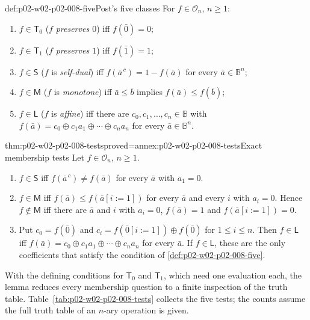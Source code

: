 \begin{hbdefinition}{def:p02-w02-p02-008-five}{Post's five classes}
For \(f\in\mathcal O_n\), \(n\geq1\):
\begin{enumerate}
\item \(f\in\mathsf T_0\) (\(f\) \emph{preserves \(0\)}) iff
  \(f(\bar0)=0\);
\item \(f\in\mathsf T_1\) (\(f\) \emph{preserves \(1\)}) iff
  \(f(\bar1)=1\);
\item \(f\in\mathsf S\) (\(f\) is \emph{self-dual}) iff
  \(f(\bar a^{\,c})=1-f(\bar a)\) for every \(\bar a\in\mathbb B^n\);
\item \(f\in\mathsf M\) (\(f\) is \emph{monotone}) iff
  \(\bar a\leq\bar b\) implies \(f(\bar a)\leq f(\bar b)\);
\item \(f\in\mathsf L\) (\(f\) is \emph{affine}) iff there are
  \(c_0,c_1,\ldots,c_n\in\mathbb B\) with
  \(f(\bar a)=c_0\oplus c_1a_1\oplus\cdots\oplus c_na_n\) for every
  \(\bar a\in\mathbb B^n\).
\end{enumerate}
\end{hbdefinition}

\begin{hblemma}{thm:p02-w02-p02-008-tests}{proved=annex:p02-w02-p02-008-tests}{Exact membership tests}
Let \(f\in\mathcal O_n\), \(n\geq1\).
\begin{enumerate}
\item \(f\in\mathsf S\) iff \(f(\bar a^{\,c})\neq f(\bar a)\) for every
  \(\bar a\) with \(a_1=0\).
\item \(f\in\mathsf M\) iff \(f(\bar a)\leq f(\bar a[i{:=}1])\) for every
  \(\bar a\) and every \(i\) with \(a_i=0\).  Hence \(f\notin\mathsf M\) iff
  there are \(\bar a\) and \(i\) with \(a_i=0\), \(f(\bar a)=1\) and
  \(f(\bar a[i{:=}1])=0\).
\item Put \(c_0=f(\bar0)\) and \(c_i=f(\bar0[i{:=}1])\oplus f(\bar0)\) for
  \(1\leq i\leq n\).  Then \(f\in\mathsf L\) iff
  \(f(\bar a)=c_0\oplus c_1a_1\oplus\cdots\oplus c_na_n\) for every
  \(\bar a\).  If \(f\in\mathsf L\), these are the only coefficients that
  satisfy the condition of \cref{def:p02-w02-p02-008-five}.
\end{enumerate}
\end{hblemma}

With the defining conditions for \(\mathsf T_0\) and \(\mathsf T_1\), which
need one evaluation each, the lemma reduces every membership question to a
finite inspection of the truth table.
Table~\ref{tab:p02-w02-p02-008-tests} collects the five tests; the counts
assume the full truth table of an \(n\)-ary operation is given.

